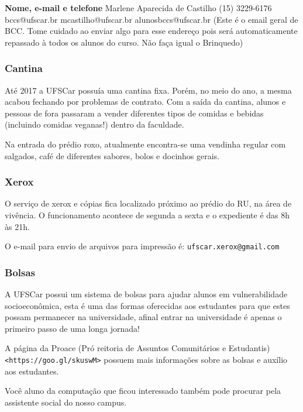 \bigbreak
\noindent \textbf{Nome, e-mail e telefone}
  \newline Marlene Aparecida de Castilho
  \newline (15) 3229-6176
  \newline bccs@ufscar.br
  \newline mcastilho@ufscar.br
  \newlina alunosbccs@ufscar.br (Este é o email geral de BCC. Tome cuidado ao enviar algo para esse endereço pois será automaticamente repassado à todos os alunos do curso. Não faça igual o Brinquedo)

\subsubsection{Cantina}
Até 2017 a UFSCar possuía uma cantina fixa. Porém, no meio do ano, a mesma acabou fechando por problemas de contrato. Com a saída da cantina, alunos e pessoas de fora passaram a vender diferentes tipos de comidas e bebidas (incluindo comidas veganas!) dentro da faculdade.

Na entrada do prédio roxo, atualmente encontra-se uma vendinha regular com salgados, café de diferentes sabores, bolos e docinhos gerais.

\subsubsection{Xerox}
O serviço de xerox e cópias fica localizado próximo ao prédio do RU, na área de vivência. O funcionamento acontece de segunda a sexta e o expediente é das 8h às 21h.

O e-mail para envio de arquivos para impressão é: \texttt{ufscar.xerox@gmail.com}


\subsubsection{Bolsas}
A UFSCar possui um sistema de bolsas para ajudar alunos em vulnerabilidade socioeconômica, esta é uma das formas oferecidas aos estudantes para que estes possam permanecer na universidade, afinal entrar na universidade é apenas o primeiro passo de uma longa jornada!


A página da Proace (Pró reitoria de Assuntos Comunitários e Estudantis) \newline \texttt{<https://goo.gl/skuswM>} possuem mais informações sobre as bolsas e auxílio aos estudantes.


Você aluno da computação que ficou interessado também pode procurar pela assistente social do nosso campus.

